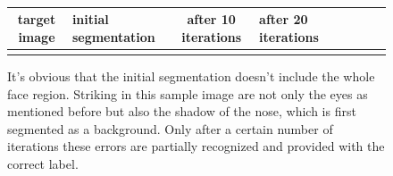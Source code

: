 \\

\begin{figure}[h]
	\begin{center}
		\begin{tabular}{SC|SC|SC|SC}
			 target image & initial segmentation & after 10 iterations & after 20 iterations\\ \hline
			 &
			 &
			 &
			 \\
		\end{tabular}
	\end{center}
	\caption{It's obvious that the initial segmentation doesn't include the whole face region. Striking in this sample image are not only the eyes as mentioned before but also the shadow of the nose, which is first segmented as a background. Only after a certain number of iterations these errors are partially recognized and provided with the correct label.}
	\label{fig:iterations}
\end{figure}

